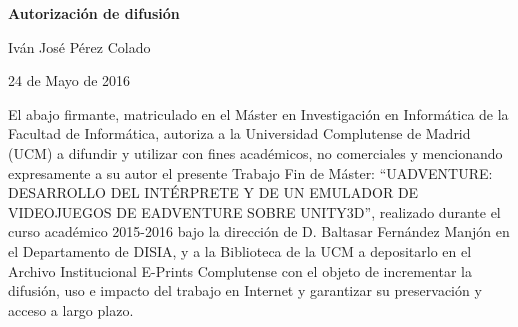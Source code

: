 
\newpage

\thispagestyle{empty}

\begin{center}

{\bf \Huge Autorización de difusión}

\vspace{1cm}


   \large Iván José Pérez Colado\\

   \vspace{0.5cm}


   24 de Mayo de 2016\\

   \vspace{0.5cm}
   \end{center}
   
El abajo firmante, matriculado en el Máster en Investigación en Informática de la Facultad de Informática, autoriza a la Universidad Complutense de Madrid (UCM) a difundir y utilizar con fines académicos, no comerciales y mencionando expresamente a su autor el presente Trabajo Fin de Máster: “UADVENTURE: DESARROLLO DEL INTÉRPRETE Y DE UN EMULADOR DE VIDEOJUEGOS DE EADVENTURE SOBRE UNITY3D”, realizado durante el curso académico 2015-2016 bajo la dirección de D. Baltasar Fernández Manjón en el Departamento de DISIA, y a la Biblioteca de la UCM a depositarlo en el Archivo Institucional E-Prints Complutense con el objeto de incrementar la difusión, uso e impacto del trabajo en Internet y garantizar su preservación y acceso a largo plazo.

